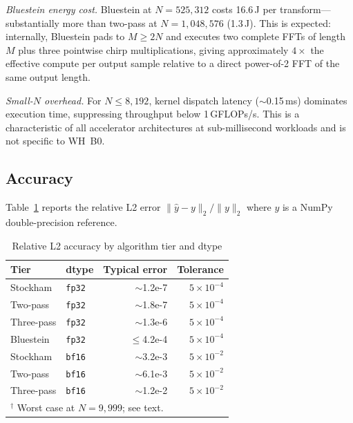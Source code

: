 \documentclass[conference]{IEEEtran}
\begin{document}
\textit{Bluestein energy cost.} Bluestein at $N = 525{,}312$ costs 16.6\,J
per transform---substantially more than two-pass at $N = 1{,}048{,}576$
(1.3\,J). This is expected: internally, Bluestein pads to $M \geq 2N$ and
executes two complete FFTs of length~$M$ plus three pointwise chirp
multiplications, giving approximately $4\times$ the effective compute per
output sample relative to a direct power-of-2 FFT of the same output length.

\textit{Small-$N$ overhead.} For $N \leq 8{,}192$, kernel dispatch latency
($\sim$0.15\,ms) dominates execution time, suppressing throughput below
1\,GFLOPs/s. This is a characteristic of all accelerator architectures at
sub-millisecond workloads and is not specific to WH~B0.

\subsection{Accuracy}

Table~\ref{tab:accuracy} reports the relative L2 error
$\|\hat{y} - y\|_2 / \|y\|_2$ where $y$ is a NumPy double-precision reference.

\begin{table}[t]
  \caption{Relative L2 accuracy by algorithm tier and dtype}
  \label{tab:accuracy}
  \centering
  \begin{tabular}{llrr}
    \toprule
    Tier & dtype & Typical error & Tolerance \\
    \midrule
    Stockham    & \texttt{fp32} & $\sim$1.2e-7 & $5{\times}10^{-4}$ \\
    Two-pass    & \texttt{fp32} & $\sim$1.8e-7 & $5{\times}10^{-4}$ \\
    Three-pass  & \texttt{fp32} & $\sim$1.3e-6 & $5{\times}10^{-4}$ \\
    Bluestein   & \texttt{fp32} & $\leq$4.2e-4\rlap{$^\dagger$}
                                             & $5{\times}10^{-4}$ \\
    Stockham    & \texttt{bf16} & $\sim$3.2e-3 & $5{\times}10^{-2}$ \\
    Two-pass    & \texttt{bf16} & $\sim$6.1e-3 & $5{\times}10^{-2}$ \\
    Three-pass  & \texttt{bf16} & $\sim$1.2e-2 & $5{\times}10^{-2}$ \\
    \bottomrule
    \multicolumn{4}{l}{$^\dagger$ Worst case at $N=9{,}999$; see text.} \\
  \end{tabular}
\end{table}
\end{document}
